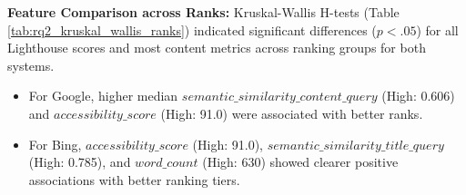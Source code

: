 \documentclass[a4paper,fleqn]{cas-sc}
\begin{document}
\textbf{Feature Comparison across Ranks:} Kruskal-Wallis H-tests (Table \ref{tab:rq2_kruskal_wallis_ranks}) indicated significant differences ($p < .05$) for all Lighthouse scores and most content metrics across ranking groups for both systems.
\begin{itemize}
    \item For Google, higher median $semantic\_similarity\_content\_query$ (High: 0.606) and $accessibility\_score$ (High: 91.0) were associated with better ranks.
    \item For Bing, $accessibility\_score$ (High: 91.0), $semantic\_similarity\_title\_query$ (High: 0.785), and $word\_count$ (High: 630) showed clearer positive associations with better ranking tiers.
\end{itemize}

\end{document}
